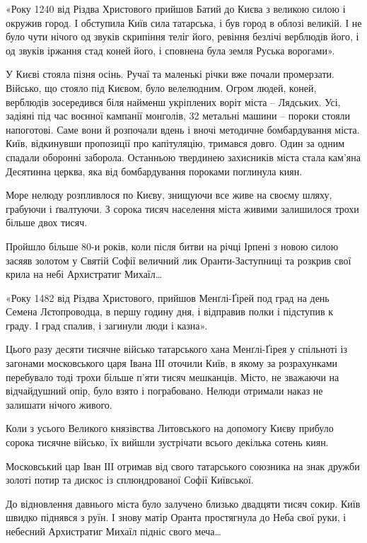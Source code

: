 «Року 1240 від Різдва Христового прийшов Батий до Києва з великою силою і
окружив город. І обступила Київ сила татарська, і був город в облозі великій. І
не було чути нічого од звуків скрипіння теліг його, ревіння безлічі верблюдів
його, і од звуків іржання стад коней його, і сповнена була земля Руська
ворогами».

У Києві стояла пізня осінь. Ручаї та маленькі річки вже почали промерзати.
Військо, що стояло під Києвом, було велелюдним. Огром людей, коней, верблюдів
зосередився біля найменш укріплених воріт міста -- Лядських. Усі, задіяні під
час воєнної кампанії монголів, 32 метальні машини – пороки стояли напоготові.
Саме вони й розпочали вдень і вночі методичне бомбардування міста. Київ,
відкинувши пропозиції про капітуляцію, тримався довго. Один за одним спадали
оборонні заборола. Останньою твердинею захисників міста стала кам’яна Десятинна
церква, яка від бомбардування пороками поглинула киян.

Море нелюду розпливлося по Києву, знищуючи все живе на своєму шляху, грабуючи і
ґвалтуючи. З сорока тисяч населення міста живими залишилося трохи більше двох
тисяч.

Пройшло більше 80-и років, коли після битви на річці Ірпені з новою силою
засяяв золотом у Святій Софії величний лик Оранти-Заступниці та розкрив свої
крила на небі Архистратиг Михаїл…

«Року 1482 від Різдва Христового, прийшов Менґлі-Ґірей под град на день Семена
Лєтопроводца, в першу годину дня, і відправив полки і підступив к граду. І град
спалив, і загинули люди і казна».

Цього разу десяти тисячне військо татарського хана Менґлі-Ґірея у спільноті із
загонами московського царя Івана ІІІ оточили Київ, в якому за розрахунками
перебувало тоді трохи більше п’яти тисяч мешканців. Місто, не зважаючи на
відчайдушний опір, було взято і пограбовано. Нелюди отримали наказ не залишати
нічого живого.

Коли з усього Великого князівства Литовського на допомогу Києву прибуло сорока
тисячне військо, їх вийшли зустрічати всього декілька сотень киян.

Московський цар Іван ІІІ отримав від свого татарського союзника на знак дружби
золоті потир та дискос із сплюндрованої Софії Київської.

До відновлення давнього міста було залучено близько двадцяти тисяч сокир. Київ
швидко піднявся з руїн. І знову матір Оранта простягнула до Неба свої руки, і
небесний Архистратиг  Михаїл підніс свого меча…

